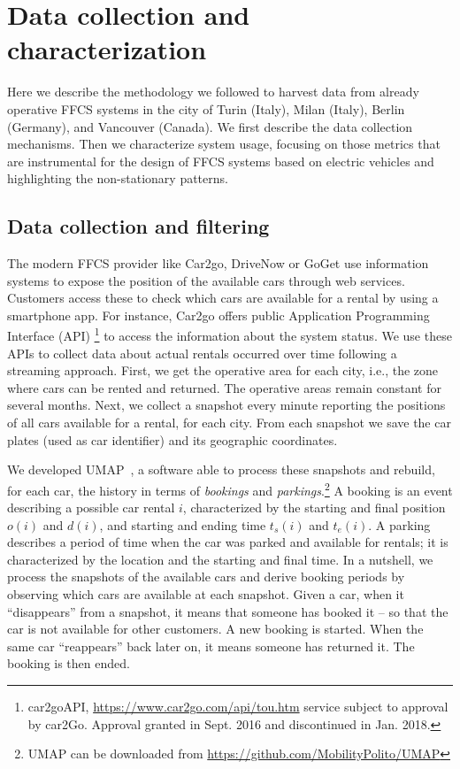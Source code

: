 \section{Data collection and characterization}
\label{sec:data}

Here we describe the methodology we followed to harvest data from already operative FFCS systems in the city of Turin (Italy), Milan (Italy), Berlin (Germany), and Vancouver (Canada). We first describe the data collection mechanisms. Then we characterize system usage, focusing on those metrics that are instrumental for the design of FFCS systems based on electric vehicles and highlighting the non-stationary patterns. 

\subsection{Data collection and filtering}
\label{par:coll_and_filter}
The modern FFCS provider like Car2go, DriveNow or GoGet use information systems to expose the position of the available cars through web services. Customers access these to check  which cars are available for a rental by using a smartphone app. For instance, Car2go offers public Application Programming Interface (API) \footnote{car2goAPI, \url{https://www.car2go.com/api/tou.htm} service subject to approval by car2Go. Approval granted in Sept. 2016 and discontinued in Jan. 2018.} to access the information about the system status. We use these APIs to collect data about actual rentals occurred over time following a streaming approach. First, we get the operative area for each city, i.e., the zone where cars can be rented and returned. The operative areas remain constant for several months.
Next, we collect a snapshot every minute reporting the positions of all cars available for a rental, for each city. From each snapshot we save the car plates (used as car identifier) and its geographic coordinates.

We developed UMAP~\cite{UMAP}, a software able to process these snapshots and rebuild, for each car, the history in terms of \emph{bookings} and \emph{parkings}.\footnote{UMAP can be downloaded from \url{https://github.com/MobilityPolito/UMAP}}
A booking is an event describing a possible car rental $i$, characterized by the starting and final position $o(i)$ and $d(i)$, and starting and ending time $t_s(i)$ and $t_e(i)$. A parking describes a period of time when the car was parked and available for rentals; it is characterized by the location and the starting and final time. In a nutshell, we process the snapshots of the available cars and derive booking periods by observing which cars are available at each snapshot.
Given a car, when it ``disappears'' from a snapshot, it means that someone has booked it -- so that the car is not available for other customers. A new booking is started. When the same car ``reappears'' back later on, it means someone has returned it. The booking is then ended.

